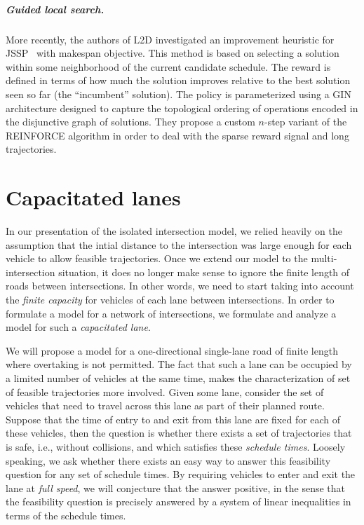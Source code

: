 \documentclass{report}
\theoremstyle{definition}
\theoremstyle{plain}
\begin{document}
\paragraph{Guided local search.}
More recently, the authors of L2D investigated an improvement heuristic for
JSSP~\cite{zhangDeepReinforcementLearning2024} with makespan objective.
%
This method is based on selecting a solution within some neighborhood of the
current candidate schedule.
%
The reward is defined in terms of how much the solution improves relative to the
best solution seen so far (the ``incumbent'' solution). The policy is
parameterized using a GIN architecture designed to capture the topological
ordering of operations encoded in the disjunctive graph of solutions. They
propose a custom $n$-step variant of the REINFORCE algorithm in order to deal
with the sparse reward signal and long trajectories.



\chapter{Capacitated lanes}\label{chap:capacitated-lanes}


In our presentation of the isolated intersection model, we relied heavily on the
assumption that the intial distance to the intersection was large enough for
each vehicle to allow feasible trajectories.
%
Once we extend our model to the multi-intersection situation, it does no longer
make sense to ignore the finite length of roads between intersections. In other
words, we need to start taking into account the \emph{finite capacity} for
vehicles of each lane between intersections.
%
In order to formulate a model for a network of intersections, we formulate
and analyze a model for such a \emph{capacitated lane}.

We will propose a model for a one-directional single-lane road of finite length
where overtaking is not permitted.
%
The fact that such a lane can be occupied by a limited number of vehicles at the
same time, makes the characterization of set of feasible trajectories more
involved.
%
Given some lane, consider the set of vehicles that need to travel across this
lane as part of their planned route. Suppose that the time of entry to and exit
from this lane are fixed for each of these vehicles, then the question is
whether there exists a set of trajectories that is safe, i.e., without
collisions, and which satisfies these \emph{schedule times}.
%
Loosely speaking, we ask whether there exists an easy way to answer this
feasibility question for any set of schedule times.
%
By requiring vehicles to enter and exit the lane at \emph{full speed}, we will
conjecture that the answer positive, in the sense that the feasibility question
is precisely answered by a system of linear inequalities in terms of the
schedule times.
\end{document}
